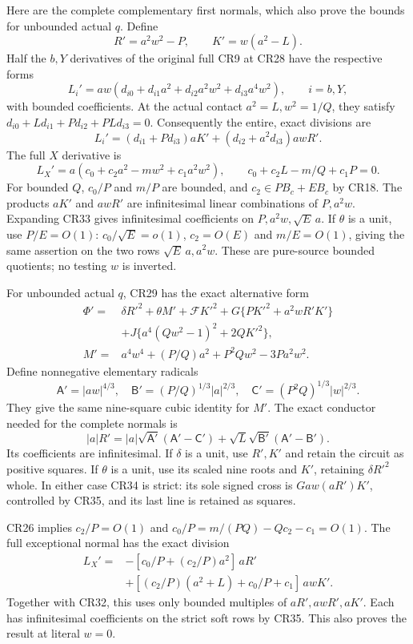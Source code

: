 Here are the complete complementary first normals, which also prove
the bounds for unbounded actual $q$. Define
\[
 R'=a^2w^2-P,\qquad K'=w(a^2-L).
 \tag{CR30}
\]
Half the $b,Y$ derivatives of the original full CR9 at CR28 have
the respective forms
\[
 L_i'=aw(d_{i0}+d_{i1}a^2+d_{i2}a^2w^2+d_{i3}a^4w^2),
 \qquad i=b,Y,
 \tag{CR31}
\]
with bounded coefficients. At the actual contact
$a^2=L,w^2=1/Q$, they satisfy
$d_{i0}+Ld_{i1}+Pd_{i2}+PLd_{i3}=0$.
Consequently the entire, exact divisions are
\[
 L_i'=(d_{i1}+Pd_{i3})aK'
                   +(d_{i2}+a^2d_{i3})awR'.
 \tag{CR32}
\]
The full $X$ derivative is
\[
 L_X'=a(c_0+c_2a^2-mw^2+c_1a^2w^2),\qquad
 c_0+c_2L-m/Q+c_1P=0.
 \tag{CR33}
\]
For bounded $Q$, $c_0/P$ and $m/P$ are bounded, and
$c_2\in P B_c+E B_c$ by CR18. The products $aK'$ and
$awR'$ are infinitesimal linear combinations of $P,a^2w$.
Expanding CR33 gives infinitesimal coefficients on
$P,a^2w,\sqrt E\,a$. If $\theta$ is a unit, use $P/E=O(1)$:
$c_0/\sqrt E=o(1)$, $c_2=O(E)$ and $m/E=O(1)$, giving the
same assertion on the two rows $\sqrt E\,a,a^2w$.
These are pure-source bounded quotients; no testing $w$ is inverted.

For unbounded actual $q$, CR29 has the exact alternative form
\[
\begin{aligned}
 \Phi'={}&\delta R'^2+\theta M'+\mathcal F K'^2
       +G\{PK'^2+a^2wR'K'\}\\
       &+J\{a^4(Qw^2-1)^2+2QK'^2\},\\
 M'={}&a^4w^4+(P/Q)a^2+P^2Qw^2-3Pa^2w^2.
\end{aligned}\tag{CR34}
\]
Define nonnegative elementary radicals
\[
 \mathsf A'=|aw|^{4/3},\quad
 \mathsf B'=(P/Q)^{1/3}|a|^{2/3},\quad
 \mathsf C'=(P^2Q)^{1/3}|w|^{2/3}.
\]
They give the same nine-square cubic identity for $M'$. The exact
conductor needed for the complete normals is
\[
 |a|R'=|a|\sqrt{\mathsf A'}(\mathsf A'-\mathsf C')
          +\sqrt L\sqrt{\mathsf B'}(\mathsf A'-\mathsf B').
 \tag{CR35}
\]
Its coefficients are infinitesimal. If $\delta$ is a unit, use
$R',K'$ and retain the circuit as positive squares. If $\theta$
is a unit, use its scaled nine roots and $K'$, retaining
$\delta R'^2$ whole. In either case CR34 is strict: its sole
signed cross is $Gaw(aR')K'$, controlled by CR35, and its last
line is retained as squares.

CR26 implies $c_2/P=O(1)$ and
$c_0/P=m/(PQ)-Qc_2-c_1=O(1)$. The full exceptional normal
has the exact division
\[
\begin{aligned}
 L_X'={}&-[c_0/P+(c_2/P)a^2]\,aR'\\
 &+[(c_2/P)(a^2+L)+c_0/P+c_1]\,awK'.
\end{aligned}\tag{CR36}
\]
Together with CR32, this uses only bounded multiples of
$aR',awR',aK'$. Each has infinitesimal coefficients on the strict
soft rows by CR35. This also proves the result at literal $w=0$.

